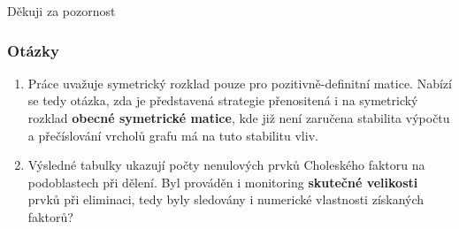 \documentclass{beamer}
\begin{document}

\begin{frame}
\Huge{\centerline{Děkuji za pozornost}}
\end{frame}


	
\begin{frame}
    \frametitle{Otázky}
    \begin{enumerate}
      \item Práce uvažuje symetrický rozklad pouze pro pozitivně-definitní matice. Nabízí se tedy otázka, zda je představená strategie přenositená i na symetrický rozklad \textbf{obecné symetrické matice}, kde již není zaručena stabilita výpočtu a přečíslování vrcholů grafu má na tuto stabilitu vliv.
      \bigskip
      \item Výsledné tabulky ukazují počty nenulových prvků Choleského faktoru na podoblastech při dělení. Byl prováděn i monitoring \textbf{skutečné velikosti} prvků při eliminaci, tedy byly sledovány i numerické vlastnosti získaných faktorů?
      
    \end{enumerate}
\end{frame}
\end{document}
